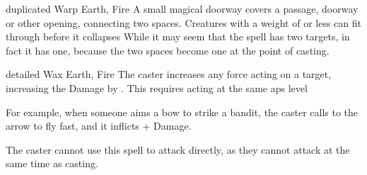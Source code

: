   {duplicated}%
  {Warp}%
  {Earth, Fire}%
  {}%
  {A small magical doorway covers a passage, doorway or other opening, connecting two spaces.
  Creatures with a \gls{weight} of  or less can fit through before it collapses}%
  {While it may seem that the spell has two targets, in fact it has one, because the two spaces become one at the point of casting.}

  {detailed}%
  {Wax}%
  {Earth, Fire}%
  {}%
  {The caster increases any force acting on a target, increasing the Damage by .
  This requires acting at the same \glspl{ap} level}%
  {For example, when someone aims a bow to strike a bandit, the caster calls to the arrow to fly fast, and it inflicts + Damage.

    The caster cannot use this spell to attack directly, as they cannot attack at the same time as casting.}

